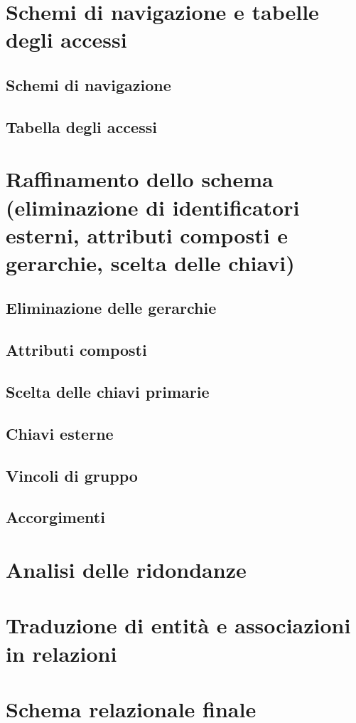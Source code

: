 \documentclass[a4paper,12pt]{report}
\begin{document}
	\section{Schemi di navigazione e tabelle degli accessi}
	\subsection{Schemi di navigazione}
	\subsection{Tabella degli accessi}
	\section{Raffinamento dello schema (eliminazione di identificatori esterni, attributi composti e gerarchie, scelta delle chiavi)}
	\subsection{Eliminazione delle gerarchie}
	\subsection{Attributi composti}
	\subsection{Scelta delle chiavi primarie}
	\subsection{Chiavi esterne}
	\subsection{Vincoli di gruppo}
	\subsection{Accorgimenti}
	\section{Analisi delle ridondanze}
	\section{Traduzione di entità e associazioni in relazioni}
	\section{Schema relazionale finale}
\end{document}
